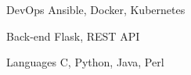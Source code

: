 

\begin{cvskills}

  \cvskill
    {DevOps} %
    {Ansible, Docker, Kubernetes} %

  \cvskill
    {Back-end} %
    {Flask, REST API} %

  \cvskill
    {Languages} %
    {C, Python, Java, Perl} %

\end{cvskills}
